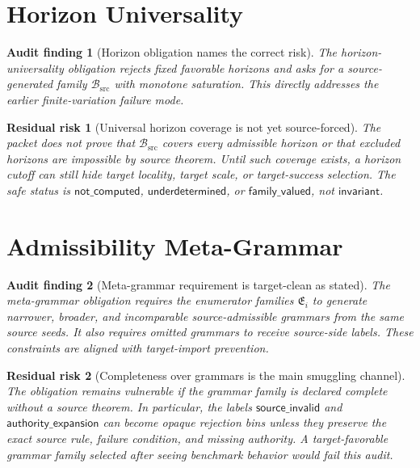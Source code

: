 \documentclass[11pt]{article}
\newcommand{\EnumFam}{\mathfrak{E}}
\newtheorem{auditfinding}{Audit finding}
\newtheorem{risk}{Residual risk}
\begin{document}
\section{Horizon Universality}

\begin{auditfinding}[Horizon obligation names the correct risk]
The horizon-universality obligation rejects fixed favorable horizons and asks
for a source-generated family \(\mathcal{B}_{\mathrm{src}}\) with monotone
saturation. This directly addresses the earlier finite-variation failure
mode.
\end{auditfinding}

\begin{risk}[Universal horizon coverage is not yet source-forced]
The packet does not prove that \(\mathcal{B}_{\mathrm{src}}\) covers every
admissible horizon or that excluded horizons are impossible by source theorem.
Until such coverage exists, a horizon cutoff can still hide target locality,
target scale, or target-success selection. The safe status is
\(\mathsf{not\_computed}\), \(\mathsf{underdetermined}\), or
\(\mathsf{family\_valued}\), not \(\mathsf{invariant}\).
\end{risk}

\section{Admissibility Meta-Grammar}

\begin{auditfinding}[Meta-grammar requirement is target-clean as stated]
The meta-grammar obligation requires the enumerator families \(\EnumFam_i\) to
generate narrower, broader, and incomparable source-admissible grammars from
the same source seeds. It also requires omitted grammars to receive source-side
labels. These constraints are aligned with target-import prevention.
\end{auditfinding}

\begin{risk}[Completeness over grammars is the main smuggling channel]
The obligation remains vulnerable if the grammar family is declared complete
without a source theorem. In particular, the labels
\(\mathsf{source\_invalid}\) and \(\mathsf{authority\_expansion}\) can become
opaque rejection bins unless they preserve the exact source rule, failure
condition, and missing authority. A target-favorable grammar family selected
after seeing benchmark behavior would fail this audit.
\end{risk}
\end{document}
